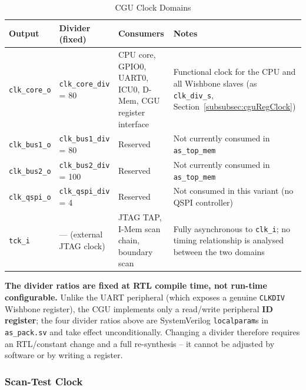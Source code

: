 \begin{table}[H]
\caption{CGU Clock Domains}
\label{tab:asCguDomains}
\centering
\begin{tabularx}{\textwidth}{|l |l |X |X|}
  \hline
  Output & Divider (fixed) & Consumers & Notes \\
  \hline
  \hline
  \texttt{clk\_core\_o} & \texttt{clk\_core\_div} = 80 &
    CPU core, GPIO0, UART0, ICU0, D-Mem, CGU register interface &
    Functional clock for the CPU and all Wishbone slaves
    (as \texttt{clk\_div\_s}, Section~\ref{subsubsec:cguRegClock}) \\
  \hline
  \texttt{clk\_bus1\_o} & \texttt{clk\_bus1\_div} = 80 & Reserved & Not currently consumed in \texttt{as\_top\_mem} \\
  \hline
  \texttt{clk\_bus2\_o} & \texttt{clk\_bus2\_div} = 100 & Reserved & Not currently consumed in \texttt{as\_top\_mem} \\
  \hline
  \texttt{clk\_qspi\_o} & \texttt{clk\_qspi\_div} = 4 & Reserved &
    Not consumed in this variant (no QSPI controller) \\
  \hline
  \texttt{tck\_i} & --- (external JTAG clock) & JTAG TAP, I-Mem scan chain, boundary scan &
    Fully asynchronous to \texttt{clk\_i}; no timing relationship is analysed
    between the two domains \\
  \hline
\end{tabularx}
\end{table}

\textbf{The divider ratios are fixed at RTL compile time, not run-time
configurable.}
Unlike the UART peripheral (which exposes a genuine \texttt{CLKDIV}
Wishbone register), the CGU implements only a read/write peripheral
\textbf{ID register}; the four divider ratios above are SystemVerilog
\texttt{localparam}s in \texttt{as\_pack.sv} and take effect unconditionally.
Changing a divider therefore requires an RTL/constant change and a full
re-synthesis -- it cannot be adjusted by software or by writing a register.

\subsubsection{Scan-Test Clock}
\label{subsubsec:scanClock}

